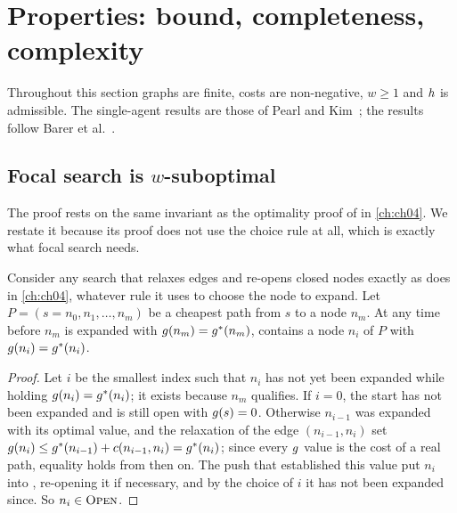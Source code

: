 \section{Properties: bound, completeness, complexity}
\label{sec:ch10-properties}

Throughout this section graphs are finite, costs are non-negative, $w \ge 1$
and $h$ is admissible. The single-agent results are those of Pearl and
Kim~\cite{pearl1982studies}; the \ecbs results follow Barer et
al.~\cite{barer2014ecbs}.

\subsection{Focal search is $w$-suboptimal}

The proof rests on the same invariant as the optimality proof of \astar in
\cref{ch:ch04}. We restate it because its proof does not use the choice rule
at all, which is exactly what focal search needs.

\begin{lemma}
\label{thm:ch10-invariant}
Consider any search that relaxes edges and re-opens closed nodes exactly as
\astar does in \cref{ch:ch04}, whatever rule it uses to choose the node to
expand.
Let $P = (s = n_0, n_1, \dots, n_m)$ be a cheapest path from $s$ to a node
$n_m$. At any time before $n_m$ is expanded with $g(n_m) = g^*(n_m)$,
\Open contains a node $n_i$ of $P$ with $g(n_i) = g^*(n_i)$.
\end{lemma}
\begin{proof}
Let $i$ be the smallest index such that $n_i$ has not yet been expanded while
holding $g(n_i) = g^*(n_i)$; it exists because $n_m$ qualifies. If
$i = 0$, the start has not been expanded and is still open with
$g(s) = 0$. Otherwise $n_{i-1}$ was expanded with its optimal value, and
the relaxation of the edge $(n_{i-1}, n_i)$ set $g(n_i) \le
g^*(n_{i-1}) + c(n_{i-1}, n_i) = g^*(n_i)$; since every $g$
value is the cost of a real path, equality holds from then on. The push that
established this value put $n_i$ into \Open, re-opening it if necessary, and
by the choice of $i$ it has not been expanded since. So $n_i \in \textsc{Open}$.
\end{proof}


